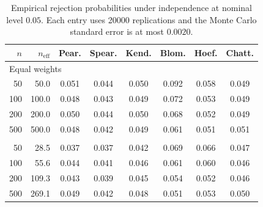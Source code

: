 \begin{table}[t]
  \centering
  \small
  \setlength{\tabcolsep}{3.5pt}
  \caption{Empirical rejection probabilities under independence at nominal level $0.05$. Each entry uses 20000 replications and the Monte Carlo standard error is at most $0.0020$.}
  \label{tab:simulation-size}
  \begin{tabular}{rrcccccc}
    \toprule
    $n$ & $n_{\mathrm{eff}}$ & Pear. & Spear. & Kend. & Blom. & Hoef. & Chatt. \\
    \midrule
    \multicolumn{8}{l}{Equal weights} \\
    50 & 50.0 & 0.051 & 0.044 & 0.050 & 0.092 & 0.058 & 0.049 \\
    100 & 100.0 & 0.048 & 0.043 & 0.049 & 0.072 & 0.053 & 0.049 \\
    200 & 200.0 & 0.050 & 0.044 & 0.050 & 0.068 & 0.052 & 0.049 \\
    500 & 500.0 & 0.048 & 0.042 & 0.049 & 0.061 & 0.051 & 0.051 \\
    \addlinespace
    \multicolumn{8}{l}{Unequal weights} \\
    50 & 28.5 & 0.037 & 0.037 & 0.042 & 0.069 & 0.066 & 0.047 \\
    100 & 55.6 & 0.044 & 0.041 & 0.046 & 0.061 & 0.060 & 0.046 \\
    200 & 109.3 & 0.043 & 0.039 & 0.045 & 0.054 & 0.052 & 0.046 \\
    500 & 269.1 & 0.049 & 0.042 & 0.048 & 0.051 & 0.053 & 0.050 \\
    \bottomrule
  \end{tabular}
\end{table}
